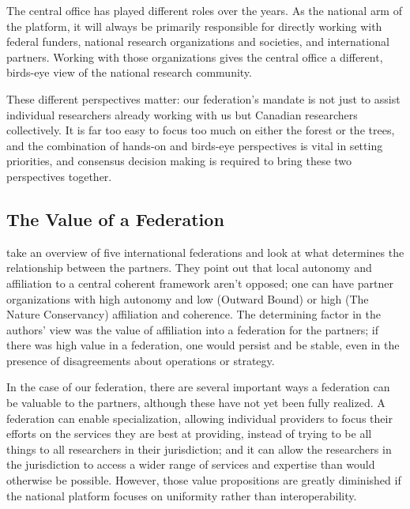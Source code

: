 \documentclass[11pt, letterpaper, twoside]{article}
\begin{document}
The central office has played different roles over the years. As the
national arm of the platform, it will always be primarily responsible
for directly working with federal funders, national research
organizations and societies, and international partners.  Working with
those organizations gives the central office a different, birds-eye view
of the national research community.

These different perspectives matter: our federation's mandate is not
just to assist individual researchers already working with us but
Canadian researchers collectively. It is far too easy to focus too much
on either the forest or the trees, and the combination of hands-on and
birds-eye perspectives is vital in setting priorities, and consensus
decision making is required to bring these two perspectives together.

\subsection*{The Value of a Federation}
%

\cite{grossman2001managing} take an overview of five international
federations and look at what determines the relationship between the
partners. They point out that local autonomy and affiliation to a
central coherent framework aren't opposed; one can have partner
organizations with high autonomy and low (Outward Bound) or high (The
Nature Conservancy) affiliation and coherence. The determining factor in
the authors' view was the value of affiliation into a federation for the
partners; if there was high value in a federation, one would persist and
be stable, even in the presence of disagreements about operations or
strategy.


In the case of our federation, there are several important ways a
federation can be valuable to the partners, although these have not yet
been fully realized. A federation can enable specialization, allowing
individual providers to focus their efforts on the services they are
best at providing, instead of trying to be all things to all researchers
in their jurisdiction; and it can allow the researchers in the
jurisdiction to access a wider range of services and expertise than
would otherwise be possible. However, those value propositions are
greatly diminished if the national platform focuses on uniformity rather
than interoperability.
\end{document}
